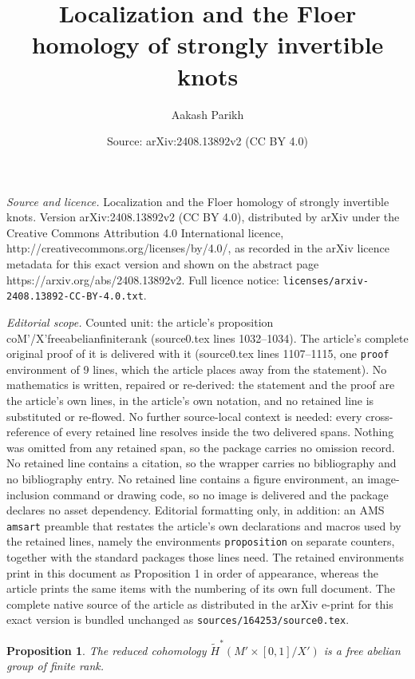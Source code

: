 \documentclass[10pt,a4paper]{amsart}
\title{Localization and the Floer homology of strongly invertible knots}
\author{Aakash Parikh}
\date{Source: arXiv:2408.13892v2 (CC BY 4.0)}
\newtheorem{proposition}{Proposition}
\begin{document}
\maketitle

\noindent\emph{Source and licence.} Localization and the Floer homology of strongly invertible knots. Version arXiv:2408.13892v2 (CC BY 4.0), distributed by arXiv under the Creative Commons Attribution 4.0 International licence, http://creativecommons.org/licenses/by/4.0/, as recorded in the arXiv licence metadata for this exact version and shown on the abstract page https://arxiv.org/abs/2408.13892v2. Full licence notice: \texttt{licenses/arxiv-2408.13892-CC-BY-4.0.txt}.\par\smallskip

\noindent\textit{Editorial scope.} Counted unit: the article's proposition coM'/X'freeabelianfiniterank (source0.tex lines 1032--1034). The article's complete original proof of it is delivered with it (source0.tex lines 1107--1115, one \texttt{proof} environment of 9 lines, which the article places away from the statement). No mathematics is written, repaired or re-derived: the statement and the proof are the article's own lines, in the article's own notation, and no retained line is substituted or re-flowed.  No further source-local context is needed: every cross-reference of every retained line resolves inside the two delivered spans.  Nothing was omitted from any retained span, so the package carries no omission record.  No retained line contains a citation, so the wrapper carries no bibliography and no bibliography entry.  No retained line contains a figure environment, an image-inclusion command or drawing code, so no image is delivered and the package declares no asset dependency.  Editorial formatting only, in addition: an AMS \texttt{amsart} preamble that restates the article's own declarations and macros used by the retained lines, namely the environments \texttt{proposition} on separate counters, together with the standard packages those lines need.  The retained environments print in this document as Proposition 1 in order of appearance, whereas the article prints the same items with the numbering of its own full document.  The complete native source of the article as distributed in the arXiv e-print for this exact version is bundled unchanged as \texttt{sources/164253/source0.tex}.
\begin{proposition}\label{coM'/X'freeabelianfiniterank}
    The reduced cohomology $\widetilde{H}^*(M'\times[0,1]/X')$ is a free abelian group of finite rank.
\end{proposition}
\end{document}
